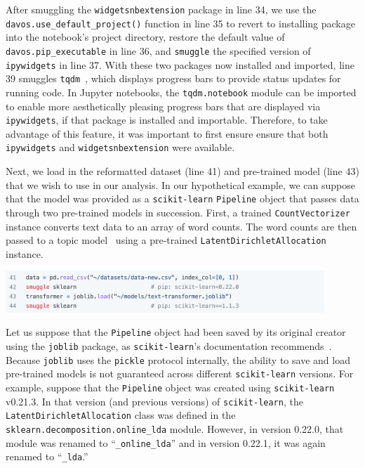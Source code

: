 \documentclass[preprint,12pt,a4paper]{elsarticle}
\begin{document}
After smuggling the \texttt{widgetsnbextension} package in line 34, we use the \texttt{davos.use\_\-default\_\-project()} function in line 35 to revert to installing package into the notebook's project directory, restore the default value of \texttt{davos.pip\_executable} in line 36, and \texttt{smuggle} the specified version of \texttt{ipywidgets} in line 37.
With these two packages now installed
and imported, line 39 smuggles \texttt{tqdm}~\cite{daCoEtal22}, which
displays progress bars to provide status updates for running code. In
Jupyter notebooks, the \texttt{tqdm.notebook} module can be imported
to enable more aesthetically pleasing progress bars that are displayed via
\texttt{ipywidgets}, if that package is installed and
importable. Therefore, to take advantage of this feature, it was
important to first ensure ensure that both \texttt{ipywidgets} and \texttt{widgetsnbextension} were available.

Next, we load in the reformatted dataset (line 41) and pre-trained
model (line 43) that we wish to use in our analysis. In our
hypothetical example, we can suppose that the model was provided as a
\texttt{scikit-learn} \texttt{Pipeline} object that passes data
through two pre-trained models in succession. First, a trained \texttt{CountVectorizer}
instance converts text data to an array of word counts. The
word counts are then passed to a topic model~\cite{BleiEtal03} using a
pre-trained \texttt{Latent\-Dir\-ich\-let\-Allocation} instance.
\begin{center}
\includegraphics[width=0.9\textwidth]{figs/example8}
\end{center}
Let us suppose that the \texttt{Pipeline} object had been saved by its
original creator using the \texttt{joblib} package, as
\texttt{scikit-learn}'s documentation recommends~\cite{skle22}. Because
\texttt{joblib} uses the \texttt{pickle} protocol internally, the
ability to save and load pre-trained models is not guaranteed across
different \texttt{scikit-learn} versions. For example, suppose that
the \texttt{Pipeline} object was created using \texttt{scikit-learn}
v0.21.3. In that version (and previous versions) of \texttt{scikit-learn}, the
\texttt{LatentDirichletAllocation} class was defined in
the \texttt{sklearn.de\-comp\-o\-si\-tion.online\_lda} module. However, in version
0.22.0, that module was renamed to ``\texttt{\_online\_lda}'' and in
version 0.22.1, it was again renamed to ``\texttt{\_lda}.''
\end{document}
